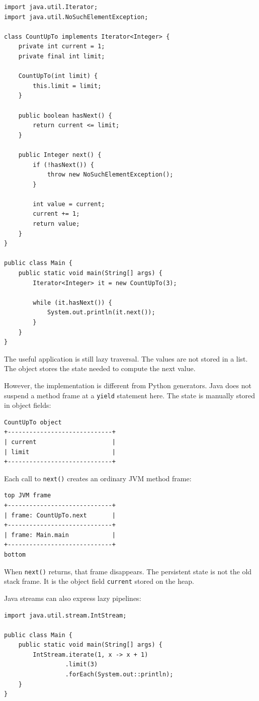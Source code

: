 \begin{verbatim}
import java.util.Iterator;
import java.util.NoSuchElementException;

class CountUpTo implements Iterator<Integer> {
    private int current = 1;
    private final int limit;

    CountUpTo(int limit) {
        this.limit = limit;
    }

    public boolean hasNext() {
        return current <= limit;
    }

    public Integer next() {
        if (!hasNext()) {
            throw new NoSuchElementException();
        }

        int value = current;
        current += 1;
        return value;
    }
}

public class Main {
    public static void main(String[] args) {
        Iterator<Integer> it = new CountUpTo(3);

        while (it.hasNext()) {
            System.out.println(it.next());
        }
    }
}
\end{verbatim}

The useful application is still lazy traversal. The values are not stored in a list. The object stores the state needed to compute the next value.

However, the implementation is different from Python generators. Java does not suspend a method frame at a \texttt{yield} statement here. The state is manually stored in object fields:

\begin{verbatim}
CountUpTo object
+-----------------------------+
| current                     |
| limit                       |
+-----------------------------+
\end{verbatim}

Each call to \texttt{next()} creates an ordinary JVM method frame:

\begin{verbatim}
top JVM frame
+-----------------------------+
| frame: CountUpTo.next       |
+-----------------------------+
| frame: Main.main            |
+-----------------------------+
bottom
\end{verbatim}

When \texttt{next()} returns, that frame disappears. The persistent state is not the old stack frame. It is the object field \texttt{current} stored on the heap.

Java streams can also express lazy pipelines:

\begin{verbatim}
import java.util.stream.IntStream;

public class Main {
    public static void main(String[] args) {
        IntStream.iterate(1, x -> x + 1)
                 .limit(3)
                 .forEach(System.out::println);
    }
}
\end{verbatim}

